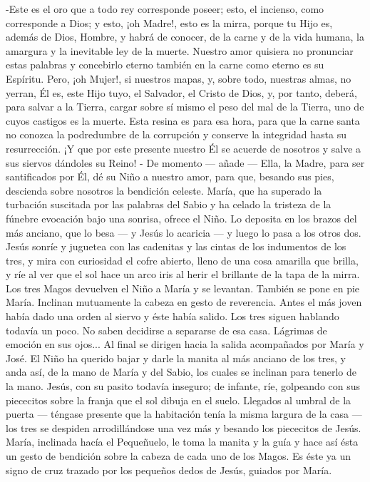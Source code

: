 \documentclass[12pt]{book} %
\begin{document}
-Este es el oro que a todo rey corresponde poseer; esto, el incienso, como corresponde a Dios; y esto, ¡oh Madre!, esto 
es la mirra, porque tu Hijo es, además de Dios, Hombre, y habrá de conocer, de la carne y de la vida humana, la amargura y la inevitable ley de la muerte. Nuestro amor quisiera no pronunciar estas palabras y concebirlo eterno también en la carne como eterno es su Espíritu. Pero, ¡oh Mujer!, si nuestros mapas, y, sobre todo, nuestras almas, no yerran, Él es, este Hijo tuyo, el Salvador, el Cristo de Dios, y, por tanto, deberá, para salvar a la Tierra, cargar sobre sí mismo el peso del mal de la Tierra, uno de cuyos castigos es la muerte. Esta resina es para esa hora, para que la carne santa no conozca la podredumbre de la corrupción y conserve la integridad hasta su resurrección. ¡Y que por este presente nuestro Él se acuerde de nosotros y salve a sus siervos dándoles su Reino! - De momento — añade — Ella, la Madre, para ser santificados por Él, dé su Niño a nuestro amor, para que, besando sus pies, descienda sobre nosotros la bendición celeste. 
María, que ha superado la turbación suscitada por las palabras del Sabio y ha celado la tristeza de la fúnebre evocación 
bajo una sonrisa, ofrece el Niño. Lo deposita en los brazos del más anciano, que lo besa — y Jesús lo acaricia — y luego lo pasa a los otros dos. 
Jesús sonríe y juguetea con las cadenitas y las cintas de los indumentos de los tres, y mira con curiosidad el cofre 
abierto, lleno de una cosa amarilla que brilla, y ríe al ver que el sol hace un arco iris al herir el brillante de la tapa de la mirra. 
Los tres Magos devuelven el Niño a María y se levantan. También se pone en pie María. Inclinan mutuamente la cabeza 
en gesto de reverencia. Antes el más joven había dado una orden al siervo y éste había salido. Los tres siguen hablando todavía un poco. No saben decidirse a separarse de esa casa. Lágrimas de emoción en sus ojos... Al final se dirigen hacia la salida acompañados por María y José. 
El Niño ha querido bajar y darle la manita al más anciano de los tres, y anda así, de la mano de María y del Sabio, los 
cuales se inclinan para tenerlo de la mano. Jesús, con su pasito todavía inseguro; de infante, ríe, golpeando con sus piececitos sobre la franja que el sol dibuja en el suelo. 
Llegados al umbral de la puerta — téngase presente que la habitación tenía la misma largura de la casa — los tres se 
despiden arrodillándose una vez más y besando los piececitos de Jesús. María, inclinada hacía el Pequeñuelo, le toma la manita y la guía y hace así ésta un gesto de bendición sobre la cabeza de cada uno de los Magos. Es éste ya un signo de cruz trazado por los pequeños dedos de Jesús, guiados por María.                       
\end{document}
